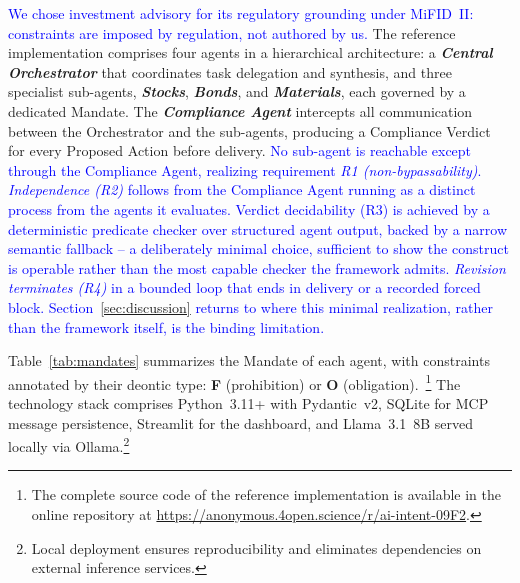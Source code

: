 \documentclass[runningheads]{llncs}
\begin{document}
\textcolor{blue}{We chose investment advisory for its regulatory grounding under MiFID~II: constraints are imposed by regulation, not authored by us.} The reference implementation comprises four agents in a hierarchical architecture:
a \textbf{\textit{Central Orchestrator}} that coordinates task delegation and synthesis, and three specialist sub-agents, \textbf{\textit{Stocks}}, \textbf{\textit{Bonds}}, and \textbf{\textit{Materials}}, each governed by a dedicated Mandate. The \textbf{\textit{Compliance Agent}} intercepts all communication between the Orchestrator and the sub-agents, producing a Compliance Verdict for every Proposed Action before delivery. \textcolor{blue}{No sub-agent is reachable except through the Compliance Agent, realizing requirement \textit{R1 (non-bypassability)}. \textit{Independence (R2)} follows from the Compliance Agent running as a distinct process from the agents it evaluates. Verdict decidability (R3) is achieved by a deterministic predicate checker over structured agent output, backed by a narrow semantic fallback -- a deliberately minimal choice, sufficient to show the construct is operable rather than the most capable checker the framework admits. \textit{Revision terminates (R4)} in a bounded loop that ends in delivery or a recorded forced block.
Section~\ref{sec:discussion} returns to where this minimal realization, rather than the framework itself, is the binding limitation.} 

Table~\ref{tab:mandates} summarizes the Mandate of each agent, with constraints annotated by their deontic type: \textbf{F} (prohibition) or \textbf{O} (obligation).~\footnote{\label{fn:materials}The complete source code of the reference implementation is available in the online repository at \url{https://anonymous.4open.science/r/ai-intent-09F2}.}
The technology stack comprises Python~3.11+ with Pydantic~v2, SQLite
for MCP message persistence, Streamlit for the dashboard, and
Llama~3.1~8B served locally via Ollama.\footnote{Local deployment
ensures reproducibility and eliminates dependencies on external
inference services.}
\end{document}
